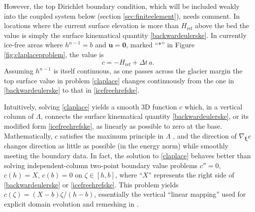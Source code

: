 \documentclass[letterpaper,final,12pt,reqno]{amsart}
\newcommand{\grad}{\nabla}
\newcommand{\bu}{\mathbf{u}}
\newcommand{\bxi}{\bm{\xi}}
\newcommand{\bzero}{\bm{0}}
\newcommand{\Href}{H_{\text{ref}}}
\begin{document}
However, the top Dirichlet boundary condition, which will be included weakly into the coupled system below (section \ref{sec:finiteelement}), needs comment.  In locations where the current surface elevation is more than $\Href$ above the bed the value is simply the surface kinematical quantity \eqref{backwardeulerske}.  In currently ice-free areas where $h^{n-1}=b$ and $\bu=\bzero$, marked ``$\ast$'' in Figure \ref{fig:claplaceproblem}, the value is
\begin{equation}
    c = - \Href + \Delta t\,a. \label{icefreehrefske}
\end{equation}
Assuming $h^{n-1}$ is itself continuous, as one passes across the glacier margin the top surface value in problem \eqref{claplace} changes continuously from the one in \eqref{backwardeulerske} to that in \eqref{icefreehrefske}.

Intuitively, solving \eqref{claplace} yields a smooth 3D function $c$ which, in a vertical column of $\Lambda$, connects the surface kinematical quantity \eqref{backwardeulerske}, or its modified form \eqref{icefreehrefske}, as linearly as possible to zero at the base.  Mathematically, $c$ satisfies the maximum principle in $\Lambda$ \cite{Evans2010}, and the direction of $\grad_{\bxi} c$ changes direction as little as possible (in the energy norm) while smoothly meeting the boundary data.  In fact, the solution to \eqref{claplace} behaves better than solving independent-column two-point boundary value problems $c''=0$, $c(h)=X$, $c(b)=0$ on $\zeta\in[h,b]$, where ``$X$'' represents the right side of \eqref{backwardeulerske} or \eqref{icefreehrefske}.  This problem yields $c(\zeta)=(X-b)\zeta/(h-b)$, essentially the vertical ``linear mapping'' used for explicit domain evolution and remeshing in \cite[equation (22)]{Lengetal2012}.
\end{document}
